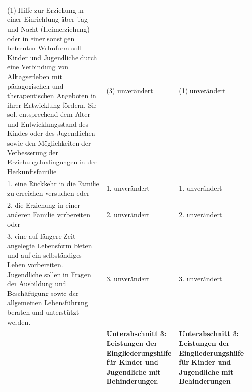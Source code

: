 \documentclass[10pt,a4paper,landscape]{article}
\begin{document}
\begin{longtable}{|L{8.2cm}|L{8.2cm}|L{8.2cm}|}
\hhline{|---|}
(1) Hilfe zur Erziehung in einer Einrichtung  \newline über Tag und Nacht (Heimerziehung) oder  \newline in einer sonstigen betreuten Wohnform soll  \newline Kinder und Jugendliche durch eine  \newline Verbindung von Alltagserleben mit  \newline pädagogischen und therapeutischen  \newline Angeboten in ihrer Entwicklung fördern. Sie  \newline soll entsprechend dem Alter und  \newline Entwicklungsstand des Kindes oder des  \newline Jugendlichen sowie den Möglichkeiten der  \newline Verbesserung der Erziehungsbedingungen  \newline in der Herkunftsfamilie & (3) unverändert & (1) unverändert \\
\hhline{|---|}
1.   \newline eine Rückkehr in die Familie zu erreichen  \newline versuchen oder & 1. unverändert & 1. unverändert \\
\hhline{|---|}
2.   \newline die Erziehung in einer anderen Familie  \newline vorbereiten oder & 2. unverändert & 2. unverändert \\
\hhline{|---|}
3.   \newline eine auf längere Zeit angelegte  \newline Lebensform bieten und auf ein  \newline selbständiges Leben vorbereiten.  \newline Jugendliche sollen in Fragen der  \newline Ausbildung und Beschäftigung sowie der  \newline allgemeinen Lebensführung beraten und  \newline unterstützt werden. & 3. unverändert & 3. unverändert \\
\hhline{|---|}
 & \textbf{Unterabschnitt 3: Leistungen der  \newline Eingliederungshilfe für Kinder und  \newline Jugendliche mit Behinderungen } & \textbf{Unterabschnitt 3: Leistungen der  \newline Eingliederungshilfe für Kinder und  \newline Jugendliche mit Behinderungen } \\

\end{longtable}
\end{document}
